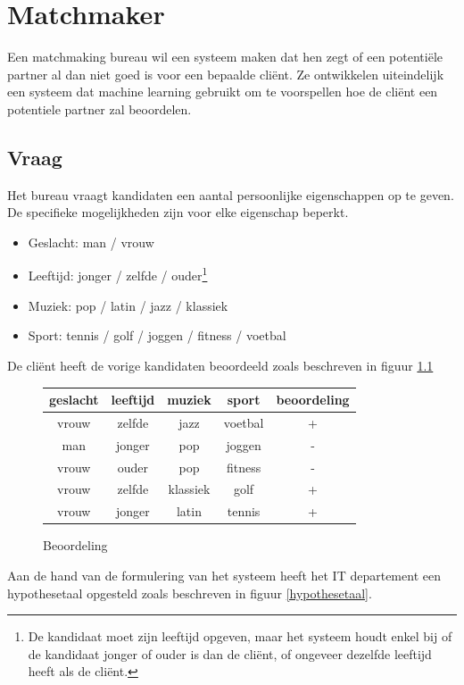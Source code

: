 \documentclass[alternative-exam.tex]{subfiles}
\begin{document}
\chapter{Matchmaker}
Een matchmaking bureau wil een systeem maken dat hen zegt of een potenti\"ele partner al dan niet goed is voor een bepaalde cli\"ent. Ze ontwikkelen uiteindelijk een systeem dat machine learning gebruikt om te voorspellen hoe de cli\"ent een potentiele partner zal beoordelen.

\section{Vraag}
Het bureau vraagt kandidaten een aantal persoonlijke eigenschappen op te geven.
De specifieke mogelijkheden zijn voor elke eigenschap beperkt.
\begin{itemize}
\item Geslacht: man / vrouw
\item Leeftijd: jonger / zelfde / ouder\footnote{De kandidaat moet zijn leeftijd opgeven, maar het systeem houdt enkel bij of de kandidaat jonger of ouder is dan de cli\"ent, of ongeveer dezelfde leeftijd heeft als de cli\"ent.}
\item Muziek: pop / latin / jazz  / klassiek
\item Sport: tennis / golf / joggen / fitness / voetbal
\end{itemize}
De cli\"ent heeft de vorige kandidaten beoordeeld zoals beschreven in figuur \ref{beoordeling}
\begin{figure}[H]
\centering
\caption{Beoordeling}
\label{beoordeling}
\begin{tabular}{|c|c|c|c|c|}
\hline
geslacht & leeftijd & muziek & sport & beoordeling\\
\hline
vrouw & zelfde & jazz & voetbal & +\\
man & jonger & pop & joggen & -\\%
vrouw & ouder & pop & fitness & -\\
vrouw & zelfde & klassiek & golf & +\\
vrouw & jonger & latin & tennis & +\\
\hline
\end{tabular}
\end{figure}
Aan de hand van de formulering van het systeem heeft het IT departement een hypothesetaal opgesteld zoals beschreven in figuur \ref{hypothesetaal}.
\end{document}
